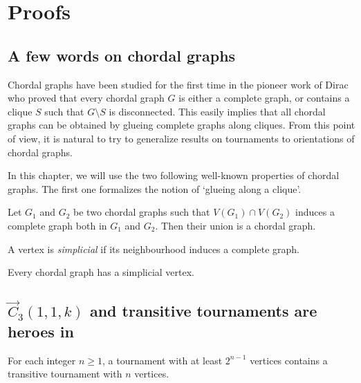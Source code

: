 

\section{Proofs}

\subsection{A few words on chordal graphs}\label{sec:chordal}

Chordal graphs have been studied for the first time in the pioneer work of Dirac~\cite{D61} who proved that every chordal graph $G$ is either a complete graph, or contains a clique $S$ such that $G \setminus S$ is disconnected. This easily implies that all chordal graphs can be obtained by glueing complete graphs along cliques. From this point of view, it is natural to try to generalize results on tournaments to orientations of chordal graphs. 

In this chapter, we will use the two following well-known properties of chordal graphs. The first one formalizes the notion of `glueing along a clique'.

\begin{lemma}\cite{D61}\label{lem:chordal_intersection_on_clique}
Let $G_1$ and $G_2$ be two chordal graphs such that $V(G_1) \cap V(G_2)$ induces a complete graph both in $G_1$ and $G_2$. Then their union is a chordal graph.
\end{lemma}

A vertex is \emph{simplicial} if its neighbourhood induces a complete graph. 
\begin{lemma}\cite{D61}\label{lem:simplicial}
Every chordal graph has a simplicial vertex. 
\end{lemma}


\subsection{$\vec C_{3}(1,1,k)$ and transitive tournaments are heroes in \ocgs}\label{sec:heroes}


\begin{theorem}\label{thm:stearns}
For each integer $n \geq 1$, a tournament with at least $2^{n-1}$ vertices contains a transitive tournament with $n$ vertices.
\end{theorem}


